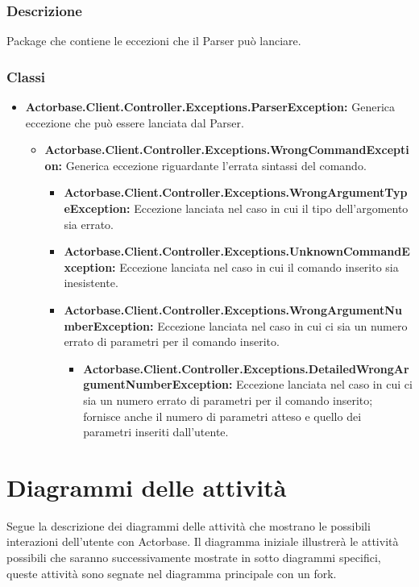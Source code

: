 \documentclass[a4paper]{article}
\begin{document}
			\subsubsection{Descrizione}
				Package che contiene le eccezioni che il Parser può lanciare.
			\subsubsection{Classi}
				\begin{itemize}
					\item \textbf{Actorbase.Client.Controller.Exceptions.ParserException:}
						Generica eccezione che può essere lanciata dal Parser.
					\begin{itemize}
						\item \textbf{Actorbase.Client.Controller.Exceptions.WrongCommandException:}
							Generica eccezione riguardante l'errata sintassi del comando.
						\begin{itemize}
							\item \textbf{Actorbase.Client.Controller.Exceptions.WrongArgumentTypeException:}
								Eccezione lanciata nel caso in cui il tipo dell'argomento sia errato.
							\item \textbf{Actorbase.Client.Controller.Exceptions.UnknownCommandException:}
								Eccezione lanciata nel caso in cui il comando inserito sia inesistente.
							\item \textbf{Actorbase.Client.Controller.Exceptions.WrongArgumentNumberException:}
								Eccezione lanciata nel caso in cui ci sia un numero errato di parametri per il comando inserito.
								\begin{itemize}
									\item \textbf{Actorbase.Client.Controller.Exceptions.DetailedWrongArgumentNumberException:}
										Eccezione lanciata nel caso in cui ci sia un numero errato di parametri per il comando inserito; fornisce anche il numero di parametri atteso e quello dei parametri inseriti dall'utente.
								\end{itemize}
						\end{itemize}						 
					\end{itemize}
				\end{itemize}
							 
	
	\newpage 
	\section{Diagrammi delle attività}
		Segue la descrizione dei diagrammi delle attività che mostrano le possibili interazioni dell'utente con Actorbase. Il diagramma iniziale illustrerà le attività possibili che saranno successivamente mostrate in sotto diagrammi specifici, queste attività sono segnate nel diagramma principale con un fork.
\end{document}
